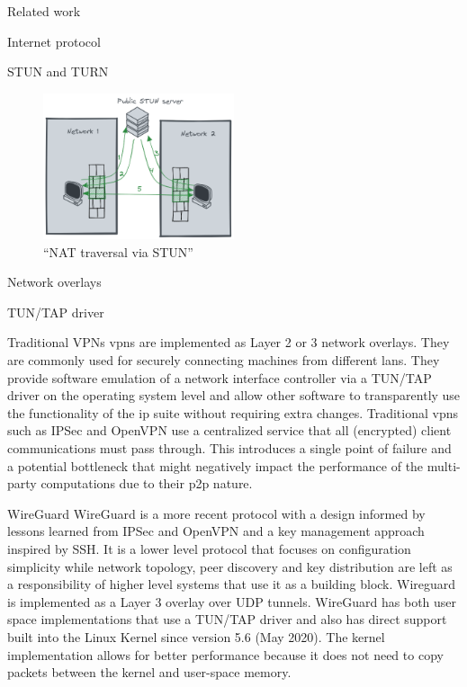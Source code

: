 \begin{frame}[fragile]{Related work}
\begin{block}{Internet protocol}
\begin{block}{STUN and TURN}
\begin{figure}
\centering
\includegraphics[width=0.5\textwidth,height=0.25\textheight]{thesis/../figures/nat-traversal.png}
\caption{``NAT traversal via STUN''\label{nat-traversal}}
\end{figure}
\end{block}
\end{block}

\begin{block}{Network overlays}
\protect\hypertarget{network-overlays}{}
\begin{block}{TUN/TAP driver}
\protect\hypertarget{tuntap-driver}{}
\end{block}

\begin{block}{Traditional VPNs}
\protect\hypertarget{traditional-vpns}{}
\glspl{vpn} are implemented as Layer 2 or 3 network overlays. They are
commonly used for securely connecting machines from different
\glspl{lan}. They provide software emulation of a network interface
controller via a TUN/TAP driver on the operating system level and allow
other software to transparently use the functionality of the \gls{ip}
suite without requiring extra changes. Traditional \glspl{vpn} such as
IPSec\autocite{ipSecDocs} and OpenVPN\autocite{openVPNDocs} use a
centralized service that all (encrypted) client communications must pass
through. This introduces a single point of failure and a potential
bottleneck that might negatively impact the performance of the
multi-party computations due to their \gls{p2p} nature.
\end{block}

\begin{block}{WireGuard}
\protect\hypertarget{wireguard}{}
WireGuard\autocite{donenfeldWireGuardNextGeneration2017} is a more
recent protocol with a design informed by lessons learned from IPSec and
OpenVPN and a key management approach inspired by SSH. It is a lower
level protocol that focuses on configuration simplicity while network
topology, peer discovery and key distribution are left as a
responsibility of higher level systems that use it as a building block.
Wireguard is implemented as a Layer 3 overlay over UDP tunnels.
WireGuard has both user space implementations that use a TUN/TAP driver
and also has direct support built into the Linux Kernel since version
5.6 (May 2020). The kernel implementation allows for better performance
because it does not need to copy packets between the kernel and
user-space memory.


\end{block}
\end{block}
\end{frame}
